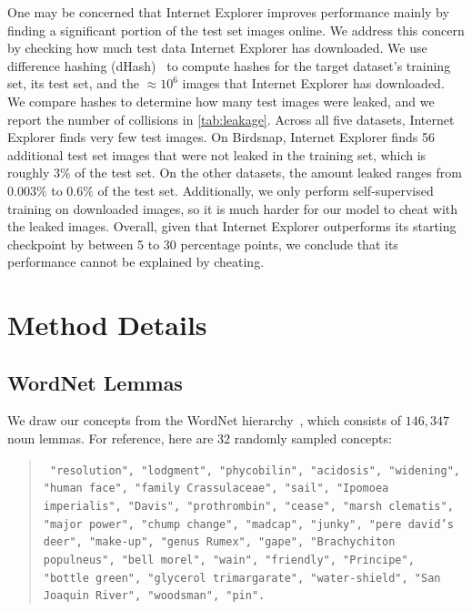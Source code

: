 One may be concerned that Internet Explorer improves performance mainly by finding a significant portion of the test set images online. We address this concern by checking how much test data Internet Explorer has downloaded. We use difference hashing (dHash)~\cite{imagehash} to compute hashes for the target dataset's training set, its test set, and the $\approx 10^6$ images that Internet Explorer has downloaded. We compare hashes to determine how many test images were leaked, and we report the number of collisions in \cref{tab:leakage}. Across all five datasets, Internet Explorer finds very few test images. On Birdsnap, Internet Explorer finds 56 additional test set images that were not leaked in the training set, which is roughly $3\%$ of the test set. On the other datasets, the amount leaked ranges from $0.003\%$ to $0.6\%$ of the test set. Additionally, we only perform self-supervised training on downloaded images, so it is much harder for our model to cheat with the leaked images. Overall, given that Internet Explorer outperforms its starting checkpoint by between 5 to 30 percentage points, we conclude that its performance cannot be explained by cheating. 

\section{Method Details}


\subsection{WordNet Lemmas}
\label{sec:wordnet_lemmas}
We draw our concepts from the WordNet hierarchy~\cite{miller1995wordnet}, which consists of $146{,}347$ noun lemmas. For reference, here are 32 randomly sampled concepts:
\begin{quote}
{\tt { 
"resolution",
"lodgment",
"phycobilin",
"acidosis",
"widening",
"human face",
"family Crassulaceae",
"sail",
"Ipomoea imperialis",
"Davis",
"prothrombin",
"cease",
"marsh clematis",
"major power",
"chump change",
"madcap",
"junky",
"pere david's deer",
"make-up",
"genus Rumex",
"gape",
"Brachychiton populneus",
"bell morel",
"wain",
"friendly",
"Principe",
"bottle green",
"glycerol trimargarate",
"water-shield",
"San Joaquin River",
"woodsman",
"pin".
}}
\end{quote}

